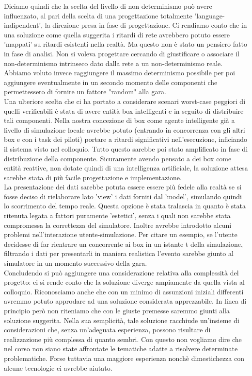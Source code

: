 Diciamo quindi che la scelta del livello di non determinismo può avere influenzato, al pari della scelta di una progettazione totalmente 'language-indipendent', la direzione presa in fase di progettazione. Ci rendiamo conto che in una soluzione come quella suggerita i ritardi di rete avrebbero potuto essere 'mappati' su ritardi esistenti nella realtà. Ma questo non è stato un pensiero fatto in fase di analisi. Non si voleva progettare cercando di giustificare o associare il non-determinismo intrinseco dato dalla rete a un non-determinismo reale. Abbiamo voluto invece raggiungere il massimo determinismo possibile per poi aggiungere eventualmente in un secondo momento delle componenti che permettessero di fornire un fattore "random" alla gara.\\
Una ulteriore scelta che ci ha portato a considerare scenari worst-case peggiori di quelli verificabili è stata di avere entità box intelligenti e in seguito di distribuire tali componenti. Nella nostra concezione di box come agente intelligente già a livello di simulazione locale avrebbe potuto (entrando in concorrenza con gli altri box e con i task dei piloti) portare a ritardi significativi nell'esecuzione, inficiando il sistema visto nel colloquio. Tutto questo sarebbe poi stato amplificato in fase di distribuzione della componente. Sicuramente avendo pensato a dei box come entità reattive, non dotate quindi di una intelligenza artificiale, la soluzione attesa sarebbe stata di più facile progettazione e implementazione.\\
La presentazione dei dati sarebbe potuta essere essere più fedele alla realtà se si fosse deciso di rielaborare lato 'view' i dati forniti dal 'model', simulando quindi lo scorrimento del tempo reale. Questa opzione è stata tralascia in quanto è stata ritenuta legata a fattori puramente 'estetici', senza i quali non sarebbe stata compromessa la correttezza del simulatore. Inoltre avrebbe introdotto alcuni problemi nell'interazione utente-simulazione. Per citare un esempio, se l'utente decidesse di far rientrare un concorrente ai box in un istante t della simulazione, filtrando i dati per presentarli in maniera realistica l'evento sarebbe giunto al simulatore in un momento successivo della gara.\\
Concludendo si può aggiungere una considerazione relativa alla complessità del progetto: ci si rende conto che la soluzione diverge ampiamente da quella vista al colloquio. Riconosciamo anche che con un minimo di assunzioni iniziali differenti avremmo potuto approdare ad una soluzione considerata apprezzabile. In linea di principio però non riteniamo che con le giuste premesse saremmo giunti alla soluzione suggerita. Nella sua semplicità, tale soluzione racchiude un'insieme di considerazioni che, senza un'adeguata esperienza, possono risultare di realizzazione più complessa di quanto sembri. Con questo non vogliamo dire che nel corso non siano state affrontate le tematiche adatte a risolvere determinate problematiche. Forse tuttavia una maggiore esperienza nonchè dimestichezza con alcune tecnologie ci avrebbe aiutato.